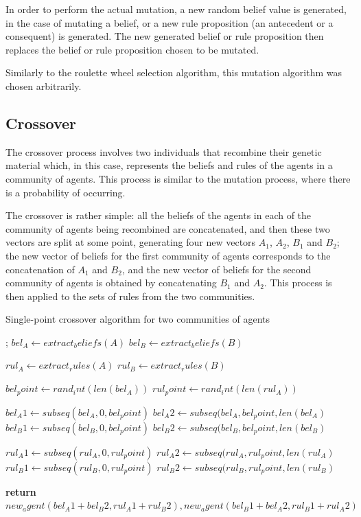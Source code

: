 In order to perform the actual mutation, a new random belief value is generated,
in the case of mutating a belief, or a new rule proposition (an antecedent or a
consequent) is generated. The new generated belief or rule proposition then
replaces the belief or rule proposition chosen to be mutated.

Similarly to the roulette wheel selection algorithm, this mutation algorithm was
chosen arbitrarily.

\subsection{Crossover}
\label{subsection:crossover}

The crossover process involves two individuals that recombine their genetic
material which, in this case, represents the beliefs and rules of the agents in
a community of agents. This process is similar to the mutation process, where
there is a probability of occurring.

The crossover is rather simple: all the beliefs of the agents in each of the
community of agents being recombined are concatenated, and then these two
vectors are split at some point, generating four new vectors $A_1$, $A_2$, $B_1$
and $B_2$; the new vector of beliefs for the first community of agents
corresponds to the concatenation of $A_1$ and $B_2$, and the new vector of
beliefs for the second community of agents is obtained by concatenating $B_1$
and $A_2$. This process is then applied to the sets of rules from the two
communities.

\begin{algorithm}
  \caption{Single-point crossover algorithm for two communities of agents}
  \label{euclid}
  \begin{algorithmic}[1]
    ;
    \State $bel_A\gets extract_beliefs(A)$
    \State $bel_B\gets extract_beliefs(B)$
    
    \State $rul_A\gets extract_rules(A)$
    \State $rul_B\gets extract_rules(B)$
    
    \State $bel_point\gets rand_int(len(bel_A))$
    \State $rul_point\gets rand_int(len(rul_A))$

    \State $bel_A1\gets subseq(bel_A, 0, bel_point)$
    \State $bel_A2\gets subseq(bel_A, bel_point, len(bel_A)$
    \State $bel_B1\gets subseq(bel_B, 0, bel_point)$
    \State $bel_B2\gets subseq(bel_B, bel_point, len(bel_B)$

    \State $rul_A1\gets subseq(rul_A, 0, rul_point)$
    \State $rul_A2\gets subseq(rul_A, rul_point, len(rul_A)$
    \State $rul_B1\gets subseq(rul_B, 0, rul_point)$
    \State $rul_B2\gets subseq(rul_B, rul_point, len(rul_B)$

    \State \textbf{return} $new_agent(bel_A1 + bel_B2, rul_A1 + rul_B2), new_agent(bel_B1 + bel_A2, rul_B1 + rul_A2)$
    \EndProcedure
  \end{algorithmic}
\end{algorithm}

